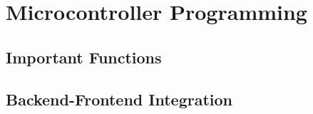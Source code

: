 \section{Microcontroller Programming}
\subsection{Important Functions}
\subsection{Backend-Frontend Integration}
